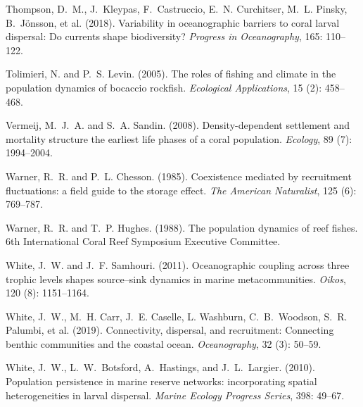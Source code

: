 \documentclass[12pt, oneside]{article}   	%
\begin{document}
\begin{thebibliography}{66}
Thompson, D.~M., J.~Kleypas, F.~Castruccio, E.~N. Curchitser, M.~L.
  Pinsky, B.~J{\"o}nsson, et al. (2018).
\newblock Variability in oceanographic barriers to coral larval dispersal: Do
  currents shape biodiversity?
\newblock \emph{Progress in Oceanography}, 165: 110--122.

Tolimieri, N. and P.~S. Levin. (2005).
\newblock The roles of fishing and climate in the population dynamics of
  bocaccio rockfish.
\newblock \emph{Ecological Applications}, 15 (2): 458--468.

Vermeij, M.~J.~A. and S.~A. Sandin. (2008).
\newblock Density-dependent settlement and mortality structure the earliest
  life phases of a coral population.
\newblock \emph{Ecology}, 89 (7): 1994--2004.

Warner, R.~R. and P.~L. Chesson. (1985).
\newblock Coexistence mediated by recruitment fluctuations: a field guide to
  the storage effect.
\newblock \emph{The American Naturalist}, 125 (6): 769--787.

Warner, R.~R. and T.~P. Hughes. (1988).
\newblock The population dynamics of reef fishes.
\newblock 6th International Coral Reef Symposium Executive Committee.

White, J.~W. and J.~F. Samhouri. (2011).
\newblock Oceanographic coupling across three trophic levels shapes
  source--sink dynamics in marine metacommunities.
\newblock \emph{Oikos}, 120 (8): 1151--1164.

White, J.~W., M.~H. Carr, J.~E. Caselle, L. Washburn, C.~B.~Woodson, S.~R. Palumbi, et al. (2019).
\newblock Connectivity, dispersal, and recruitment: Connecting benthic communities and the coastal ocean.
\newblock \emph{Oceanography}, 32 (3): 50--59.

White, J.~W., L.~W.~Botsford, A.~Hastings, and J.~L.~Largier. (2010).
\newblock Population persistence in marine reserve networks: incorporating
  spatial heterogeneities in larval dispersal.
\newblock \emph{Marine Ecology Progress Series}, 398: 49--67.

\end{thebibliography}


\end{document}
